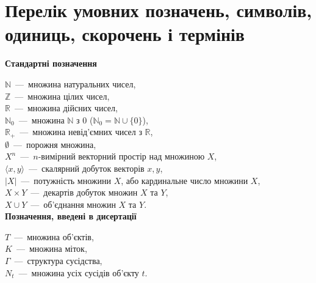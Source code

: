 \chapter*{Перелік умовних позначень, символів, одиниць, скорочень і термінів}

\textbf{Стандартні позначення}

 \noindent$\mathbb{N}$~---~множина натуральних чисел, \\
 \noindent$\mathbb{Z}$~---~множина цілих чисел, \\
 \noindent$\mathbb{R}$~---~множина дійсних чисел, \\
 \noindent$\mathbb{N}_0$~---~множина $\mathbb{N}$ з $0$ ($\mathbb{N}_0=\mathbb{N}\cup\{0\}$), \\
 \noindent$\mathbb{R}_+$~---~множина невід'ємних чисел з $\mathbb{R}$, \\
 \noindent$\emptyset $~---~порожня  множина, \\
 \noindent$X^n$~---~$n$-вимірний векторний простір над множиною $X$, \\
 \noindent$\langle x, y\rangle $~---~скалярний добуток векторів $x,y$, \\
 \noindent$\left| X \right| $~---~потужність множини $X$, або кардинальне число множини $X$, \\
 \noindent$X \times Y$~---~декартів добуток множин $X$ та $Y$, \\
 \noindent$X \cup Y$~---~об'єднання множин $X$ та $Y$. \\

\textbf{Позначення, введені в дисертації}

 \noindent$T$~---~множина об'єктів, \\
 \noindent$K$~---~множина міток, \\
 \noindent$\Gamma$~---~структура сусідства, \\
 \noindent$N_t$~---~множина усіх сусідів об'єкту $t$. \\
